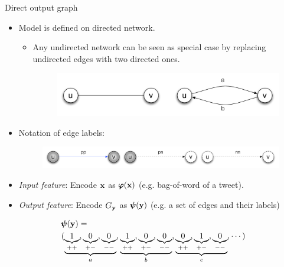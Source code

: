 \documentclass[first=dgreen,second=purple,logo=red]{aaltoslides}
\begin{document}
\begin{frame}{Direct output graph}
	\begin{itemize}\footnotesize
		\item Model is defined on directed network.
		\begin{itemize}\footnotesize
			\item Any undirected network can be seen as special case by replacing undirected edges with two directed ones.
			\begin{figure}
				\center
				\includegraphics[scale=0.2]{./figures/model_definition.pdf}
			\end{figure}
		\end{itemize}
		\item Notation of edge labels:
		\begin{figure}
			\center
			\includegraphics[scale=0.2]{./figures/notations.pdf}
		\end{figure}
		\item {\it Input feature}: Encode $\mathbf {x}$ as $\pmb \varphi(\mathbf {x})$ (e.g. bag-of-word of a tweet).
		\item {\it Output feature}: Encode $G_{\mathbf {y}}$ as $\pmb \psi(\mathbf {y})$ (e.g. a set of edges and their labels)
	\end{itemize}
	\begin{multicols}{2}
	{\scriptsize
		\begin{align*}
			&\pmb \psi(\mathbf {y}) = \\
			& ( \underbrace{\underbrace{1}_{++}, \underbrace{0}_{+-}, \underbrace{0}_{--}}_{a}, 
			\underbrace{\underbrace{1}_{++}, \underbrace{0}_{+-}, \underbrace{0}_{--}}_{b},
			\underbrace{\underbrace{0}_{++}, \underbrace{1}_{+-}, \underbrace{0}_{--}}_{c},\cdots)
		\end{align*}}
	\begin{figure}

\end{figure}
\end{multicols}
\end{frame}
\end{document}
